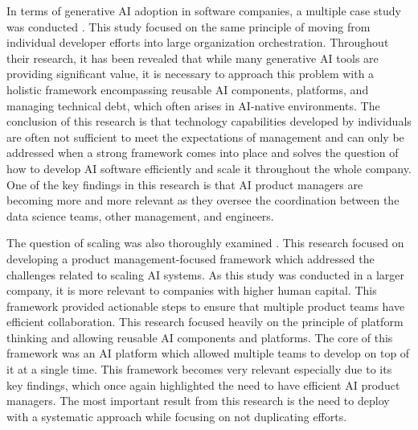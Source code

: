 \documentclass[]{imc-inf}
\begin{document}
In terms of generative AI adoption in software companies, a multiple case study was conducted \citep{Kemell2025}. This study focused on the same principle of moving from individual developer efforts into large organization orchestration. Throughout their research, it has been revealed that while many generative AI tools are providing significant value, it is necessary to approach this problem with a holistic framework encompassing reusable AI components, platforms, and managing technical debt, which often arises in AI-native environments. The conclusion of this research is that technology capabilities developed by individuals are often not sufficient to meet the expectations of management and can only be addressed when a strong framework comes into place and solves the question of how to develop AI software efficiently and scale it throughout the whole company. One of the key findings in this research is that AI product managers are becoming more and more relevant as they oversee the coordination between the data science teams, other management, and engineers. 



The question of scaling was also thoroughly examined \citep{Nwashili2025}. This research focused on developing a product management-focused framework which addressed the challenges related to scaling AI systems. As this study was conducted in a larger company, it is more relevant to companies with higher human capital. This framework provided actionable steps to ensure that multiple product teams have efficient collaboration. This research focused heavily on the principle of platform thinking and allowing reusable AI components and platforms. The core of this framework was an AI platform which allowed multiple teams to develop on top of it at a single time. This framework becomes very relevant especially due to its key findings, which once again highlighted the need to have efficient AI product managers. The most important result from this research is the need to deploy with a systematic approach while focusing on not duplicating efforts. 
\end{document}
